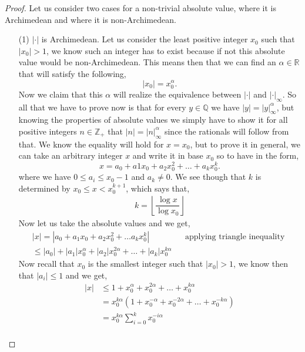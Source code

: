 \documentclass[12pt]{article}
\theoremstyle{definition}
\theoremstyle{remark}
\newcommand{\zz}{\mathbb Z}   %
\newcommand{\qq}{\mathbb Q}   %
\newcommand{\rr}{\mathbb R}   %
\newcommand{\abs}[1]{\left\lvert#1\right\rvert} %
\renewcommand{\leq}{\leqslant}
\newcommand{\lrp}[1]{\left(#1\right)}
\begin{document}
    \begin{proof}
      Let us consider two cases for a non-trivial absolute value, where it is Archimedean and where it is non-Archimedean.
      \begin{itemize}
        \item[(1)] $\abs{\cdot}$ is Archimedean. Let us consider the least positive integer $x_0$ such that $\abs{x_0} > 1$, we know such an integer has to exist because if not this absolute value would be non-Archimedean. This means then that we can find an $\alpha \in \rr$ that will satisfy the following,
        \[\abs{x_0} = x_0^{\alpha}.\] 
        Now we claim that this $\alpha$ will realize the equivalence between $\abs{\cdot}$ and $\abs{\cdot}_\infty$. So all that we have to prove now is that for every $y \in \qq $ we have $\abs{y} = \abs{y}_\infty ^{\alpha}$, but knowing the properties of absolute values we simply have to show it for all positive integers $n \in \zz_+$ that $\abs{n} = \abs{n}_\infty ^{\alpha}$ since the rationals will follow from that. We know the equality will hold for $ x = x_0$, but to prove it in general, we can take an arbitrary integer $x$ and write it in base $x_0$ so to have in the form,
        \[x = a_0 + a1x_0 + a_2x_0^{2} + \dots + a_kx_0^{k}.\]
        where we have $0 \leq a_i \leq x_0 - 1$ and $a_k \neq 0$. We see though that $k$ is determined by $x_0 \leq x < x_0^{k+1}$, which says that,
        \begin{align*}
          k = \left\lfloor \dfrac{\log{x}}{\log{x_0}}\right\rfloor 
        \end{align*} 
        Now let us take the absolute values and we get,
        \begin{align*}
          \abs{x} = \abs{a_0 + a_1x_0 + a_2x_0^{2} + \dots a_kx_0^{k}} && \text{applying triangle inequality } \\
          \leq \abs{a_0} + \abs{a_1}x_0^{\alpha} + \abs{a_2}x_0^{2\alpha} + \dots + \abs{a_k}x_0^{k\alpha}         
        \end{align*}
        Now recall that $x_0$ is the smallest integer such that $\abs{x_0} > 1 $, we know then that $\abs{a_i} \leq 1$ and we get,
        \begin{align*}
          \abs{x} &\leq 1 + x_0^{\alpha} + x_0^{2\alpha} + \dots + x_0^{k\alpha} \\
                  &= x_0^{k\alpha}\lrp{1 + x_0^{-\alpha} + x_0^{-2\alpha} + \dots + x_0^{-k\alpha}} \\
                  &= x_0^{k\alpha}\sum_{i = 0}^{k}x_0^{-i\alpha} \\

\end{align*}
\end{itemize}
\end{proof}
\end{document}
